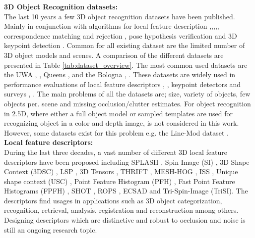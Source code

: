 \documentclass[10pt,twocolumn,letterpaper]{article}
\begin{document}
\noindent
\textbf{3D Object Recognition datasets:}\\
The last 10 years a few 3D object recognition datasets have been published. Mainly in conjunction with algorithms for local feature description \cite{Mian2006},\cite{Taati2007},\cite{Taati2011},\cite{Tombari2010},\cite{Salti2014}, correspondence matching and rejection \cite{Rodola2013}, pose hypothesis verification \cite{Aldoma2012} and 3D keypoint detection \cite{Mian2010}. Common for all existing dataset are the limited number of 3D object models and scenes. A comparison of the different datasets are presented in Table \ref{tab:dataset_overview}. The most common used datasets are the UWA  \cite{Mian2006}, \cite{Mian2010}, Queens \cite{Taati2007},\cite{Taati2011} and the Bologna \cite{Salti2014}, \cite{Tombari2010}. These datasets are widely used in performance evaluations of  local feature descriptors \cite{Guo2015}, \cite{Buch2016}, keypoint detectors \cite{Salti2011} and surveys \cite{Guo2014}, \cite{FilipeAlexandre2014}. The main problems of all the datasets are; size, variety of objects, few objects per. scene and missing occlusion/clutter estimates. For object recognition in 2.5D, where either a full object model or sampled templates are used for recognizing object in a color and depth image, is not considered in this work. However, some datasets exist for this problem e.g. the Line-Mod dataset \cite{Hinterstoisser2012}.\\   

\noindent
\textbf{Local feature descriptors:}\\
During the last three decades, a vast number of different 3D local feature descriptors have been proposed including SPLASH \cite{Stein1992}, Spin Image (SI) \cite{Johnson1999}, 3D Shape Context (3DSC) \cite{Frome2004}, LSP \cite{ChenBhanu2004}, 3D Tensors \cite{Mian2006}, THRIFT \cite{Flint2007}, MESH-HOG \cite{Zaharescu2009}, ISS \cite{Zhong2009}, Unique shape context (USC) \cite{usc2010}, Point Feature Histogram (PFH) \cite{Rusu2008}, Fast Point Feature Histograms (FPFH) \cite{Fpfh2009}, SHOT \cite{Tombari2010}, ROPS \cite{Guo2013}, ECSAD \cite{Ecsad2015} and Tri-Spin-Image (TriSI)\cite{Guo2015}. The descriptors find usages in applications such as 3D object categorization, recognition, retrieval, analysis, registration and reconstruction among others. Designing descriptors which are distinctive and robust to occlusion and noise is still an ongoing research topic. 
\end{document}
